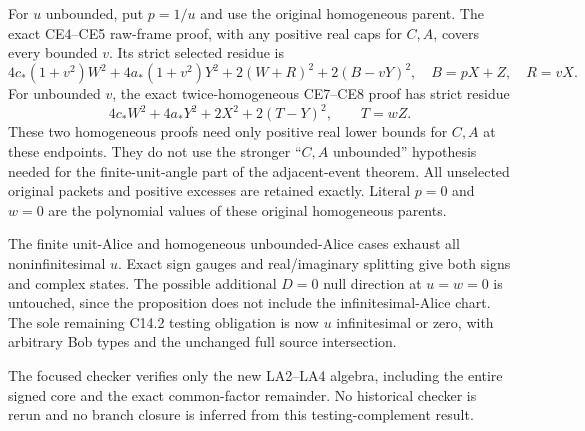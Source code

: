 For $u$ unbounded, put $p=1/u$ and use the original homogeneous
parent.  The exact CE4--CE5 raw-frame proof, with any positive real
caps for $C,A$, covers every bounded $v$.  Its strict selected
residue is
\[
 4c_*(1+v^2)W^2+4a_*(1+v^2)Y^2
                      +2(W+R)^2+2(B-vY)^2,
 \quad B=pX+Z,\quad R=vX.                         \tag{LA6}
\]
For unbounded $v$, the exact twice-homogeneous CE7--CE8 proof has
strict residue
\[
 4c_*W^2+4a_*Y^2+2X^2+2(T-Y)^2,
 \qquad T=wZ.                                    \tag{LA7}
\]
These two homogeneous proofs need only positive real lower bounds
for $C,A$ at these endpoints.  They do not use the stronger
``$C,A$ unbounded'' hypothesis needed for the finite-unit-angle part
of the adjacent-event theorem.  All unselected original packets and
positive excesses are retained exactly.  Literal $p=0$ and $w=0$
are the polynomial values of these original homogeneous parents.

The finite unit-Alice and homogeneous unbounded-Alice cases exhaust
all noninfinitesimal $u$.  Exact sign gauges and real/imaginary splitting
give both signs and complex states.  The possible additional $D=0$
null direction at $u=w=0$ is untouched, since the proposition does
not include the infinitesimal-Alice chart.  The sole remaining C14.2
testing obligation is now $u$ infinitesimal or zero, with arbitrary
Bob types and the unchanged full source intersection.

The focused checker verifies only the new LA2--LA4 algebra, including
the entire signed core and the exact common-factor remainder.  No
historical checker is rerun and no branch closure is inferred from
this testing-complement result.
